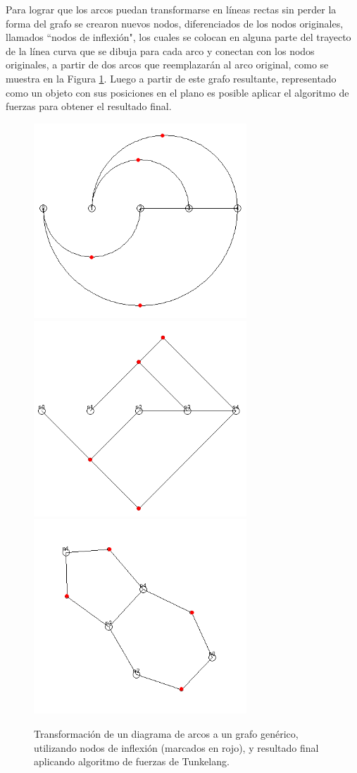 Para lograr que los arcos puedan transformarse en líneas rectas sin perder la forma del grafo se crearon nuevos nodos, diferenciados de los nodos originales, llamados ``nodos de inflexión", los cuales se colocan en alguna parte del trayecto de la línea curva que se dibuja para cada arco y conectan con los nodos originales, a partir de dos arcos que reemplazarán al arco original, como se muestra en la Figura \ref{fig:transformacion_arc_generico}. Luego a partir de este grafo resultante, representado como un objeto con sus posiciones en el plano es posible aplicar el algoritmo de fuerzas para obtener el resultado final.

\begin{figure}
	\centering
	\includegraphics[width=8cm]{imagenes/transformacion_arc_generico_1.png}
	\includegraphics[width=8cm]{imagenes/transformacion_arc_generico_3.png}
	\includegraphics[width=8cm]{imagenes/transformacion_arc_generico_2.png}
	\caption{Transformación de un diagrama de arcos a un grafo genérico, utilizando nodos de inflexión (marcados en rojo), y resultado final aplicando algoritmo de fuerzas de Tunkelang.}
	\label{fig:transformacion_arc_generico}
\end{figure}